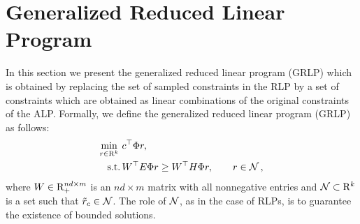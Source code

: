 \section{Generalized Reduced Linear Program}
In this section we present the generalized reduced linear program (GRLP) which is obtained by replacing the set of sampled constraints in the RLP by a set of constraints which are obtained as linear combinations of the original constraints of the ALP. Formally, we define the generalized reduced linear program (GRLP) as follows:
\begin{align}\label{grlp}
\begin{split}
\underset{r\in \R^k}{\min}\, &\, c^\top \Phi r,\\
\text{s.t.}\mb & \,W^\top E\Phi r\geq W^\top H \Phi r, \qquad r\in \N\,,
\end{split}
\end{align}
where $W \in \mathrm{R}_+^{nd\times m}$ is an $nd\times m$ matrix with all nonnegative entries and 
$\mathcal{N} \subset \mathrm{R}^k$ is a set such that $\tilde{r}_c \in \mathcal{N}$. 
The role of $\mathcal{N}$, as in the case of RLPs, is to guarantee
the existence of bounded solutions. 

